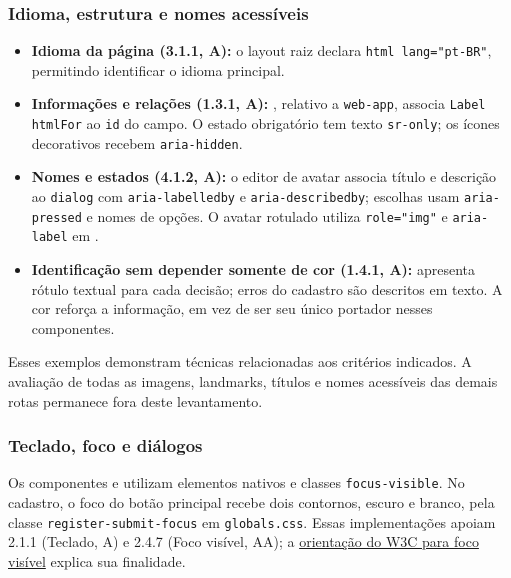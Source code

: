 \documentclass[12pt,a4paper]{article}
\begin{document}
\subsubsection{Idioma, estrutura e nomes acessíveis}
\begin{itemize}
  \item \textbf{Idioma da página (3.1.1, A):} o layout raiz declara \texttt{html lang="pt-BR"}, permitindo identificar o idioma principal.
  \item \textbf{Informações e relações (1.3.1, A):} , relativo a \texttt{web-app}, associa \texttt{Label htmlFor} ao \texttt{id} do campo. O estado obrigatório tem texto \texttt{sr-only}; os ícones decorativos recebem \texttt{aria-hidden}.
  \item \textbf{Nomes e estados (4.1.2, A):} o editor de avatar associa título e descrição ao \texttt{dialog} com \texttt{aria-labelledby} e \texttt{aria-describedby}; escolhas usam \texttt{aria-pressed} e nomes de opções. O avatar rotulado utiliza \texttt{role="img"} e \texttt{aria-label} em .
  \item \textbf{Identificação sem depender somente de cor (1.4.1, A):}  apresenta rótulo textual para cada decisão; erros do cadastro são descritos em texto. A cor reforça a informação, em vez de ser seu único portador nesses componentes.
\end{itemize}

Esses exemplos demonstram técnicas relacionadas aos critérios indicados. A avaliação de todas as imagens, landmarks, títulos e nomes acessíveis das demais rotas permanece fora deste levantamento.

\subsubsection{Teclado, foco e diálogos}
Os componentes  e  utilizam elementos nativos e classes \texttt{focus-visible}. No cadastro, o foco do botão principal recebe dois contornos, escuro e branco, pela classe \texttt{register-submit-focus} em \texttt{globals.css}. Essas implementações apoiam 2.1.1 (Teclado, A) e 2.4.7 (Foco visível, AA); a \href{https://www.w3.org/WAI/WCAG22/Understanding/focus-visible.html}{orientação do W3C para foco visível} explica sua finalidade.
\end{document}

